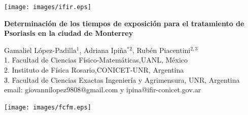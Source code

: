 \documentclass{article}
\begin{document}
\vspace*{-2cm}
\changefontsizes{14pt}
\hspace*{-1cm}
\begin{minipage}{0.2\linewidth}
\vspace{0.7cm}
\vspace*{-0.15cm}
\texttt{[image: images/ifir.eps]}
\end{minipage}
\vspace*{-0.4cm}
\begin{minipage}{0.65\linewidth}
\vspace*{0.7cm}
\begin{center}
\changefontsizes{15pt}
\hspace*{-0.1cm}
\textbf{\textcolor{na}{Determinación de los tiempos de exposición para el tratamiento de Psoriasis en la ciudad de Monterrey}}
\end{center}
\vspace{-1cm}
\begin{center}
\begin{small}
Gamaliel López-Padilla$^1$, Adriana Ipiña$^{*2}$, Rubén Piacentini$^{2,3}$\\
1. Facultad de Ciencias Físico-Matemáticas,UANL, México\\
2. Instituto de Física Rosario,CONICET-UNR, Argentina\\
3. Facultad de Ciencias Exactas Ingeniería y Agrimensura, UNR, Argentina\\
email: giovannilopez9808@gmail.com y ipina@ifir-conicet.gov.ar
\end{small}
\end{center}
\end{minipage}
\begin{minipage}{0.2\linewidth}
\hspace*{0.2cm}
\texttt{[image: images/fcfm.eps]}
\end{minipage}
\end{document}
